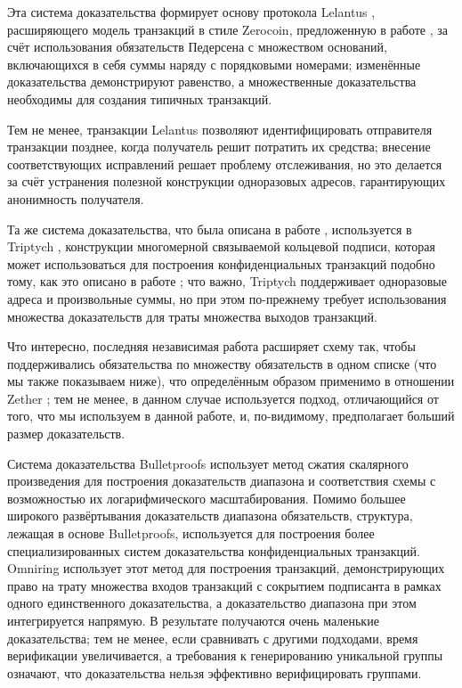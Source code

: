 \documentclass{article}
\theoremstyle{definition}
\begin{document}
Эта система доказательства формирует основу протокола Lelantus \cite{lelantus}, расширяющего модель транзакций в стиле Zerocoin, предложенную в работе \cite{groth}, за счёт использования обязательств Педерсена с множеством оснований, включающихся в себя суммы наряду с порядковыми номерами; изменённые доказательства демонстрируют равенство, а множественные доказательства необходимы для создания типичных транзакций.

Тем не менее, транзакции Lelantus позволяют идентифицировать отправителя транзакции позднее, когда получатель решит потратить их средства; внесение соответствующих исправлений решает проблему отслеживания, но это делается за счёт устранения полезной конструкции одноразовых адресов, гарантирующих анонимность получателя.

Та же система доказательства, что была описана в работе \cite{groth}, используется в Triptych \cite{triptych}, конструкции многомерной связываемой кольцевой подписи, которая может использоваться для построения конфиденциальных транзакций подобно тому, как это описано в работе \cite{ringct}; что важно, Triptych поддерживает одноразовые адреса и произвольные суммы, но при этом по-прежнему требует использования множества доказательств для траты множества выходов транзакций.

Что интересно, последняя независимая работа расширяет схему \cite{groth} так, чтобы поддерживались обязательства по множеству обязательств в одном списке (что мы также показываем ниже), что определённым образом применимо в отношении Zether \cite{zether}; тем не менее, в данном случае используется подход, отличающийся от того, что мы используем в данной работе, и, по-видимому, предполагает больший размер доказательств.

Система доказательства Bulletproofs \cite{bulletproofs} использует метод сжатия скалярного произведения для построения доказательств диапазона и соответствия схемы с возможностью их логарифмического масштабирования.
Помимо большее широкого развёртывания доказательств диапазона обязательств, структура, лежащая в основе Bulletproofs, используется для построения более специализированных систем доказательства конфиденциальных транзакций.
Omniring \cite{omniring} использует этот метод для построения транзакций, демонстрирующих право на трату множества входов транзакций с сокрытием подписанта в рамках одного единственного доказательства, а доказательство диапазона при этом интегрируется напрямую. В результате получаются очень маленькие доказательства; тем не менее, если сравнивать с другими подходами, время верификации увеличивается, а требования к генерированию уникальной группы означают, что доказательства нельзя эффективно верифицировать группами.
\end{document}
